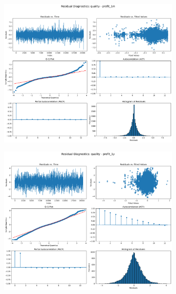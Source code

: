 \documentclass[11pt,english,a4paper,hidelinks]{book}
\begin{document}
\begin{figure}[H]
    \centering
    \begin{subfigure}[b]{0.32\textwidth}
        \centering
        \includegraphics[width=\textwidth]{images/code/models/linear_regression/third_model/LAT/quality_profit_1m_residuals.png}
    \end{subfigure}
    \hfill
    \begin{subfigure}[b]{0.32\textwidth}
        \centering
        \includegraphics[width=\textwidth]{images/code/models/linear_regression/third_model/LAT/quality_profit_1y_residuals.png}

\end{subfigure}
\end{figure}
\end{document}
